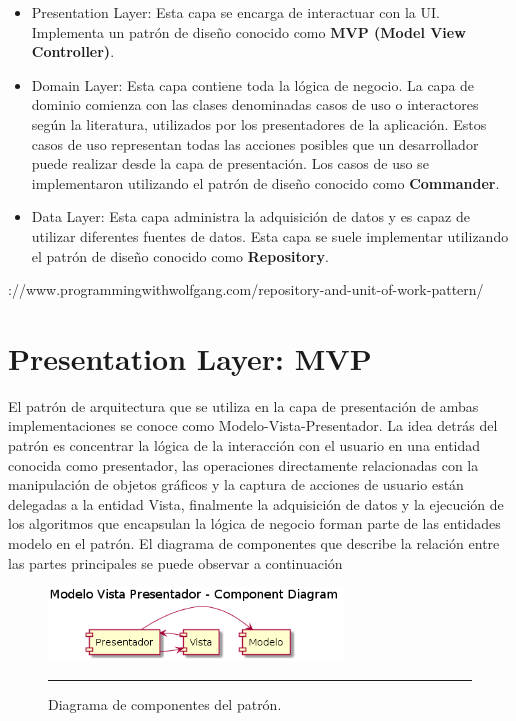 \begin{itemize}
	\item Presentation Layer: Esta capa se encarga de interactuar con la UI. Implementa un patrón de diseño conocido como \textbf{MVP (Model View Controller)}. 
	\item Domain Layer: Esta capa contiene toda la lógica de negocio. La capa de dominio comienza con las clases denominadas casos de uso o interactores según la literatura, utilizados por los presentadores de la aplicación. Estos casos de uso representan todas las acciones posibles que un desarrollador puede realizar desde la capa de presentación. Los casos de uso se implementaron utilizando el patrón de diseño conocido como \textbf{Commander}.
	\item Data Layer: Esta capa administra la adquisición de datos y es capaz de utilizar diferentes fuentes de datos. Esta capa se suele implementar utilizando el patrón de diseño conocido como \textbf{Repository}.  
\end{itemize}
\https://www.programmingwithwolfgang.com/repository-and-unit-of-work-pattern/
\section{Presentation Layer: MVP}
El patrón de arquitectura que se utiliza en la capa de presentación de ambas implementaciones se conoce como Modelo-Vista-Presentador.
La idea detrás del patrón es concentrar la lógica de la interacción con el usuario en una entidad conocida como presentador, las operaciones directamente relacionadas con la manipulación de objetos gráficos y la captura de acciones de usuario están delegadas a la entidad Vista, finalmente la adquisición de datos y la ejecución de los algoritmos que encapsulan la lógica de negocio forman parte de las entidades modelo en el patrón.
El diagrama de componentes que describe la relación entre las partes principales se puede observar a continuación

\begin{figure}[htbp]
	\centering
	\includegraphics[width=0.7\textwidth]{Figures/uml_mvp_component.png}
	\rule{35em}{1pt}
	\caption[MVP Components]{Diagrama de componentes del patrón.}
	\label{fig:uml_mvp_component}
\end{figure}

